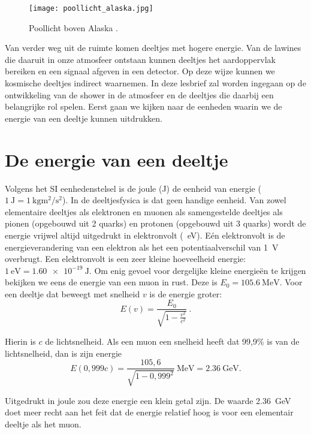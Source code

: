 \begin{figure}
    \centering
    \texttt{[image: poollicht\_alaska.jpg]}
    \caption{Poollicht boven Alaska \cite{strang}.}
    \label{fig:poollicht}
\end{figure}

Van verder weg uit de ruimte komen deeltjes met hogere energie. Van de
lawines die daaruit in onze atmosfeer ontstaan kunnen deeltjes het
aardoppervlak bereiken en een signaal afgeven in een \hisparc detector.
Op deze wijze kunnen we kosmische deeltjes indirect waarnemen. In deze
lesbrief zal worden ingegaan op de ontwikkeling van de shower in de
atmosfeer en de deeltjes die daarbij een belangrijke rol spelen. Eerst
gaan we kijken naar de eenheden waarin we de energie van een deeltje
kunnen uitdrukken.


\section{De energie van een deeltje}

Volgens het SI eenhedenstelsel is de joule (J) de eenheid van energie
($\SI{1}{\joule} = \SI{1}{\kilo\gram\square\meter\per\square\second}$).
In de deeltjesfysica is dat geen handige eenheid. Van zowel elementaire
deeltjes als elektronen en muonen als samengestelde deeltjes als pionen
(opgebouwd uit 2 quarks) en protonen (opgebouwd uit 3 quarks) wordt de
energie vrijwel altijd uitgedrukt in elektronvolt
(\SI{}{\electronvolt}). Eén elektronvolt is de energieverandering van
een elektron als het een potentiaalverschil van \SI{1}{\volt} overbrugt.
Een elektronvolt is een zeer kleine hoeveelheid energie:
$\SI{1}{\electronvolt} = \SI{1,60e-19}{\joule}$. Om enig gevoel voor
dergelijke kleine energieën te krijgen bekijken we eens de energie van
een muon in rust. Deze is $E_0 = \SI{105,6}{\mega\electronvolt}$. Voor
een deeltje dat beweegt met snelheid $v$ is de energie groter:
\begin{equation}
    E(v) = \frac{E_0}{\sqrt{1-\frac{v^2}{c^2}}} \ . \nonumber
\end{equation}

Hierin is $c$ de lichtsnelheid. Als een muon een snelheid heeft dat
99,9\% is van de lichtsnelheid, dan is zijn energie
\begin{equation}
    E(0,999c) = \frac{105,6}{\sqrt{1-0,999^2}}\SI{}{\mega\electronvolt}
    = \SI{2,36}{\giga\electronvolt}. \nonumber
\end{equation}

Uitgedrukt in joule zou deze energie een klein getal zijn. De waarde
\SI{2,36}{\giga\electronvolt} doet meer recht aan het feit dat de
energie relatief hoog is voor een elementair deeltje als het muon.
\\

